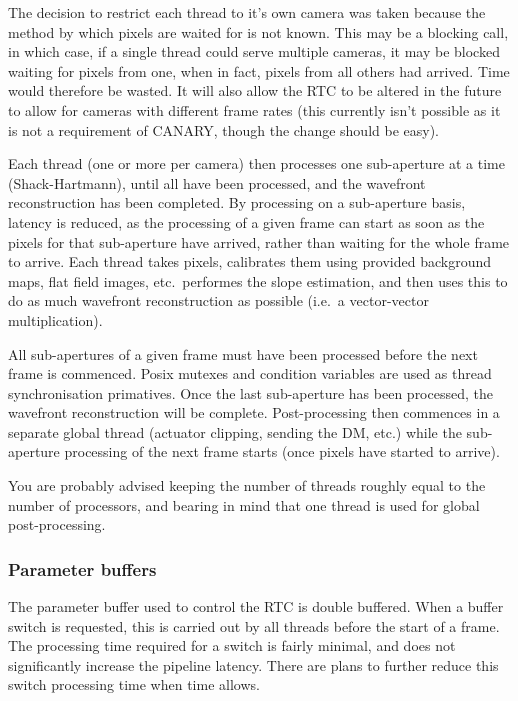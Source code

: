 \documentclass[a4,10pt]{article}
\begin{document}
The decision to restrict each thread to it's own camera was taken
because the method by which pixels are waited for is not known.  This
may be a blocking call, in which case, if a single thread could serve
multiple cameras, it may be blocked waiting for pixels from one, when
in fact, pixels from all others had arrived.  Time would therefore be
wasted.  It will also allow the RTC to be altered in the future to
allow for cameras with different frame rates (this currently isn't
possible as it is not a requirement of CANARY, though the change
should be easy).

Each thread (one or more per camera) then processes one sub-aperture
at a time (Shack-Hartmann), until all have been processed, and the
wavefront reconstruction has been completed.  By processing on a
sub-aperture basis, latency is reduced, as the processing of a given
frame can start as soon as the pixels for that sub-aperture have
arrived, rather than waiting for the whole frame to arrive.  Each
thread takes pixels, calibrates them using provided background maps,
flat field images, etc.\ performes the slope estimation, and then uses
this to do as much wavefront reconstruction as possible (i.e.\ a
vector-vector multiplication).  

All sub-apertures of a given frame must have been processed before the
next frame is commenced.  Posix mutexes and condition variables are
used as thread synchronisation primatives.  Once the last sub-aperture
has been processed, the wavefront reconstruction will be complete.
Post-processing then commences in a separate global thread (actuator
clipping, sending the DM, etc.) while the sub-aperture processing of
the next frame starts (once pixels have started to arrive).

You are probably advised keeping the number of threads roughly equal to the
number of processors, and bearing in mind that one thread is used for
global post-processing.

\subsubsection{Parameter buffers}
The parameter buffer used to control the RTC is double buffered.  When
a buffer switch is requested, this is carried out by all threads
before the start of a frame.  The processing time required for a
switch is fairly minimal, and does not significantly increase the
pipeline latency.  There are plans to further reduce this switch processing time when time allows.
\end{document}
